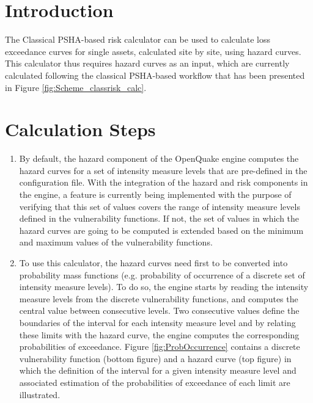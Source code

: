 \section{Introduction}
The Classical PSHA-based risk calculator can be used to calculate loss exceedance curves for single assets, calculated site by site, using hazard curves. This calculator thus requires hazard curves as an input, which are currently calculated following the classical PSHA-based workflow that has been presented in Figure \ref{fig:Scheme_classrisk_calc}.

\section{Calculation Steps}

\begin{enumerate}
\item By default, the hazard component of the OpenQuake engine computes the hazard curves for a set of intensity measure levels that are pre-defined in the configuration file. With the integration of the hazard and risk components in the engine, a feature is currently being implemented with the purpose of verifying that this set of values covers the range of intensity measure levels defined in the vulnerability functions. If not, the set of values in which the hazard curves are going to be computed is extended based on the minimum and maximum values of the vulnerability functions.

\item To use this calculator, the hazard curves need first to be converted into probability mass functions (e.g. probability of occurrence of a discrete set of intensity measure levels). To do so, the engine starts by reading the intensity measure levels from the discrete vulnerability functions, and computes the central value between consecutive levels. Two consecutive values define the boundaries of the interval for each intensity measure level and by relating these limits with the hazard curve, the engine computes the corresponding probabilities of exceedance. Figure \ref{fig:ProbOccurrence} contains a discrete vulnerability function (bottom figure) and a hazard curve (top figure) in which the definition of the interval for a given intensity measure level and associated estimation of the probabilities of exceedance of each limit are illustrated. 


\end{enumerate}
